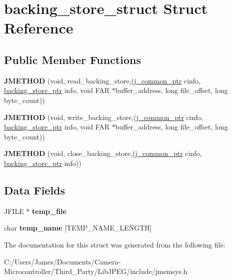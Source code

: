 \hypertarget{structbacking__store__struct}{}\section{backing\+\_\+store\+\_\+struct Struct Reference}
\label{structbacking__store__struct}
\subsection*{Public Member Functions}
\begin{DoxyCompactItemize}
\item 
\mbox{\label{structbacking__store__struct_afe521b3b06bb2efe7d5747f1fb1b0e70}} 
{\bfseries J\+M\+E\+T\+H\+OD} (void, read\+\_\+backing\+\_\+store,(\hyperlink{structjpeg__common__struct}{j\+\_\+common\+\_\+ptr} cinfo, \hyperlink{structbacking__store__struct}{backing\+\_\+store\+\_\+ptr} info, void F\+AR $\ast$buffer\+\_\+address, long file\+\_\+offset, long byte\+\_\+count))
\item 
\mbox{\label{structbacking__store__struct_a7b1cc3259cdc2ffff27cda487afa4f85}} 
{\bfseries J\+M\+E\+T\+H\+OD} (void, write\+\_\+backing\+\_\+store,(\hyperlink{structjpeg__common__struct}{j\+\_\+common\+\_\+ptr} cinfo, \hyperlink{structbacking__store__struct}{backing\+\_\+store\+\_\+ptr} info, void F\+AR $\ast$buffer\+\_\+address, long file\+\_\+offset, long byte\+\_\+count))
\item 
\mbox{\label{structbacking__store__struct_a722811750ff2f306a309c0e91a94d68b}} 
{\bfseries J\+M\+E\+T\+H\+OD} (void, close\+\_\+backing\+\_\+store,(\hyperlink{structjpeg__common__struct}{j\+\_\+common\+\_\+ptr} cinfo, \hyperlink{structbacking__store__struct}{backing\+\_\+store\+\_\+ptr} info))
\end{DoxyCompactItemize}
\subsection*{Data Fields}
\begin{DoxyCompactItemize}
\item 
\mbox{\label{structbacking__store__struct_ad44c865ceacf1c7c640f074029a20066}} 
J\+F\+I\+LE $\ast$ {\bfseries temp\+\_\+file}
\item 
\mbox{\label{structbacking__store__struct_a87a7809b17a4656ef28504a897ecca7a}} 
char {\bfseries temp\+\_\+name} \mbox{[}T\+E\+M\+P\+\_\+\+N\+A\+M\+E\+\_\+\+L\+E\+N\+G\+TH\mbox{]}
\end{DoxyCompactItemize}


The documentation for this struct was generated from the following file\+:\begin{DoxyCompactItemize}
\item 
C\+:/\+Users/\+James/\+Documents/\+Camera-\/\+Microcontroller/\+Third\+\_\+\+Party/\+Lib\+J\+P\+E\+G/include/jmemsys.\+h\end{DoxyCompactItemize}
